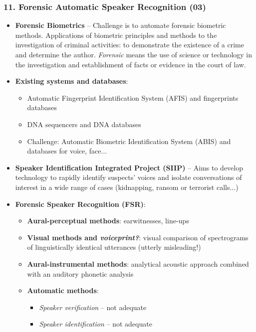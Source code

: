 \documentclass[a4paper]{article}
\begin{document}
    \subsubsection*{11. Forensic Automatic Speaker Recognition (03)}
      \begin{itemize}
        \item \textbf{Forensic Biometrics} -- Challenge is to automate forensic biometric methods. Applications of biometric principles and methods to the investigation of criminal activities: to demonstrate the existence of a crime and determine the author. \emph{Forensic} means the use of science or technology in the investigation and establishment of facts or evidence in the court of law.
        \item \textbf{Existing systems and databases}:
        \begin{itemize}
          \item Automatic Fingerprint Identification System (AFIS) and fingerprints databases
          \item DNA sequencers and DNA databases
          \item Challenge: Automatic Biometric Identification System (ABIS) and databases for voice, face...
        \end{itemize}
        \item \textbf{Speaker Identification Integrated Project (SIIP)} -- Aims to develop technology to rapidly identify suspects' voices and isolate conversations of interest in a wide range of cases (kidnapping, ransom or terrorist calls...)
        \item \textbf{Forensic Speaker Recognition (FSR)}:
        \begin{itemize}
          \item \textbf{Aural-perceptual methods}: earwitnesses, line-ups
          \item \textbf{Visual methods and \emph{voiceprint?}}: visual comparison of spectrograms of linguistically identical utterances (utterly misleading!)
          \item \textbf{Aural-instrumental methods}: analytical acoustic approach combined with an auditory phonetic analysis
          \item \textbf{Automatic methods}:
          \begin{itemize}
            \item \emph{Speaker verification} -- not adequate
            \item \emph{Speaker identification} -- not adequate

\end{itemize}
\end{itemize}
\end{itemize}
\end{document}
